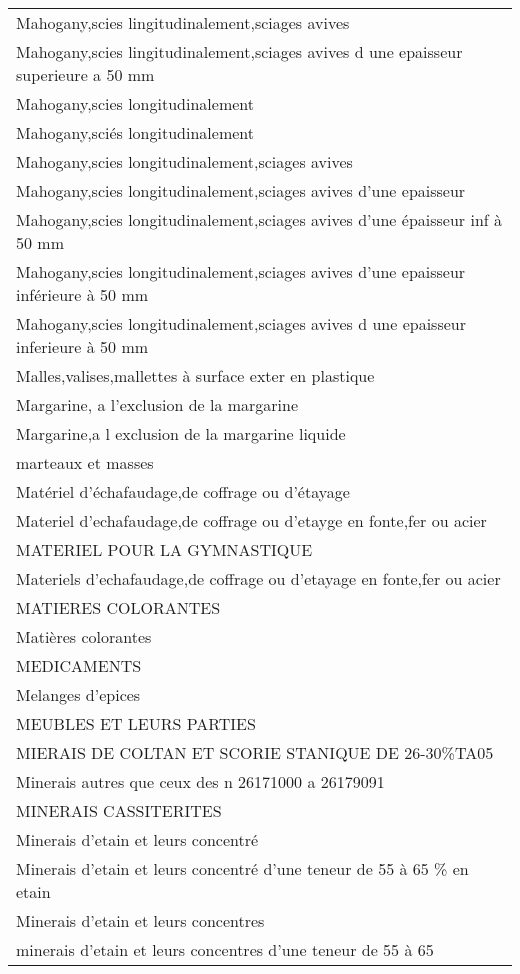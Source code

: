 \documentclass[
]{book}
\begin{document}
\begin{longtable}[t]{l}
Mahogany,scies lingitudinalement,sciages avives\\
Mahogany,scies lingitudinalement,sciages avives d une epaisseur superieure a 50 mm\\
Mahogany,scies longitudinalement\\
Mahogany,sciés longitudinalement\\
\addlinespace
Mahogany,scies longitudinalement,sciages avives\\
Mahogany,scies longitudinalement,sciages avives d'une epaisseur\\
Mahogany,scies longitudinalement,sciages avives d'une épaisseur inf à 50 mm\\
Mahogany,scies longitudinalement,sciages avives d'une epaisseur inférieure à 50 mm\\
Mahogany,scies longitudinalement,sciages avives d une epaisseur inferieure à 50 mm\\
\addlinespace
Malles,valises,mallettes à surface exter en plastique\\
Margarine, a l'exclusion de la margarine\\
Margarine,a l exclusion de la margarine liquide\\
marteaux et masses\\
Matériel d'échafaudage,de coffrage ou d'étayage\\
\addlinespace
Materiel d'echafaudage,de coffrage ou d'etayge en fonte,fer ou acier\\
MATERIEL POUR LA GYMNASTIQUE\\
Materiels d'echafaudage,de coffrage ou d'etayage en fonte,fer ou acier\\
MATIERES COLORANTES\\
Matières colorantes\\
\addlinespace
MEDICAMENTS\\
Melanges d'epices\\
MEUBLES ET LEURS PARTIES\\
MIERAIS DE COLTAN    ET SCORIE STANIQUE DE 26-30\%TA05\\
Minerais autres que ceux des n 26171000 a 26179091\\
\addlinespace
MINERAIS CASSITERITES\\
Minerais d'etain et leurs concentré\\
Minerais d'etain et leurs concentré d'une teneur de 55 à 65 \% en etain\\
Minerais d'etain et leurs concentres\\
minerais d'etain et leurs concentres d'une teneur de 55 à 65\\

\end{longtable}
\end{document}
